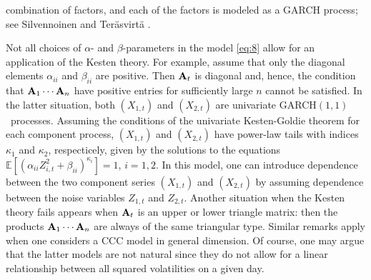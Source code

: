 \documentclass[11pt,a4]{amsart}
\newcommand{\garch}{{\rm GARCH}$(1,1)$}
\newcommand{\bfA}{{\bf A}}
\newcommand{\E }{{\mathbb E}}
\newcommand{\1}{{\mathbf 1}}
\begin{document}
combination of factors, and each of the factors is modeled as a GARCH
process; see Silvennoinen and Ter\"asvirt\"a \cite{silventeras:2009}.
\par
Not all choices of $\alpha$- and $\beta$-parameters in the model \eqref{eq:8} allow for an
application of the Kesten theory. For example, assume that only the diagonal elements $\alpha_{ii}$ and $\beta_{ii}$ are positive.
Then $\bfA_t$ is diagonal and, hence, the condition that $\bfA_1\cdots\bfA_n$ have positive entries for sufficiently large $n$ 
cannot be satisfied. In the latter situation, both $(X_{1,t})$ and $(X_{2,t})$ are univariate \garch\ processes. Assuming the
conditions of the univariate Kesten-Goldie theorem for each component process, $(X_{1,t})$ and $(X_{2,t})$ have power-law tails
with indices $\kappa_1$ and $\kappa_2$, respecticely,  given by the solutions to the equations 
$\E [(\alpha_{ii} Z_{i,t}^2+\beta_{ii})^{\kappa_i}]=1$, $i=1,2$. In this model, one can introduce dependence between the two component series $(X_{1,t})$ and $(X_{2,t})$ by assuming dependence between the noise variables $Z_{1,t}$ and $Z_{2,t}$. Another situation when the Kesten theory fails
appears when $\bfA_t$ is an upper or lower triangle matrix: then the products  $\bfA_1\cdots\bfA_n$ are always of the same triangular type.
Similar remarks apply when one considers a CCC model in general dimension. Of course, one may argue that the latter models
are not natural since they do not allow for a linear relationship between all squared volatilities
on a given day. 
\end{document}
